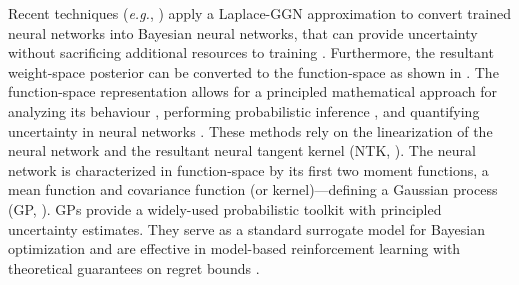 \documentclass{article}
\makeatletter
\newcommand{\eg}{\textit{e.g.\@}\xspace}
\makeatother
\begin{document}
Recent techniques (\eg, \cite{ritter2018kfac,khan2019approximate,daxberger2021laplace,fortuin2021bayesian,immer2021scalable}) apply a Laplace-GGN approximation to convert trained neural networks into Bayesian neural networks, that can provide uncertainty without sacrificing additional resources to training \cite{foong2019between}. Furthermore, the resultant weight-space posterior can be converted to the function-space as shown in \cite{khan2019approximate, immer2021improving}. The function-space representation allows for a principled mathematical approach for analyzing its behaviour \cite{cho2009kernel,meronen2020stationary}, performing probabilistic inference \cite{khan2019approximate}, and quantifying uncertainty in neural networks \cite{foong2019between}. These methods rely on the linearization of the neural network and the resultant neural tangent kernel (NTK, \cite{jacot2018neural}). The neural network is characterized in function-space by its first two moment functions, a mean function and covariance function (or kernel)---defining a Gaussian process (GP, \cite{rasmussen2006gaussian}). GPs provide a widely-used probabilistic toolkit with principled uncertainty estimates. They serve as a standard surrogate model for Bayesian optimization \citep{garnett_bayesoptbook_2022} and are effective in model-based reinforcement learning \citep{deisenroth2011pilco} with theoretical guarantees on regret bounds \citep{srinivas2009gaussian}.
\end{document}
